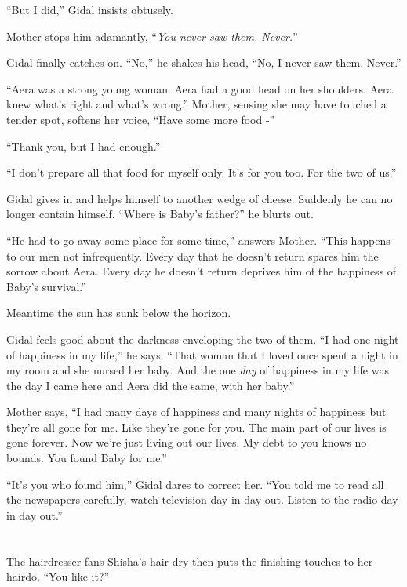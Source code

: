 \documentclass[twoside,11pt]{book}
\begin{document}
``But I did,'' Gidal insists obtusely.

Mother stops him adamantly, ``\textit{You never saw them. Never.}''

Gidal finally catches on. ``No,'' he shakes his head, ``No, I never saw them. Never.''

``Aera was a strong young woman. Aera had a good head on her shoulders. Aera knew what's right and what's
wrong.'' Mother, sensing she may have touched a tender spot, softens her voice, ``Have some
more food -''

``Thank you, but I had enough.''

``I don't prepare all that food for myself only. It's for you too. For the two of us.''

Gidal gives in and helps himself to another wedge of cheese. Suddenly he can no longer contain himself.
``Where is Baby's father?'' he blurts out.

``He had to go away some place for some time,'' answers Mother. ``This happens to
our men not infrequently. Every day that he doesn't return spares him the sorrow about Aera. Every day he doesn't
return deprives him of the happiness of Baby's survival.''

Meantime the sun has sunk below the horizon.

Gidal feels good about the darkness enveloping the two of them. ``I had one night of happiness in my
life,'' he says. ``That woman that I loved once spent a night in my room and she nursed her
baby. And the{ }one \textit{day }of happiness in my life was the day I came
here and Aera did the same, with her baby.''

Mother says, ``I had many days of happiness and many nights of happiness but they're all gone for me. Like
they're gone for you. The main part of our lives is gone forever. Now we're just living out our lives. My debt to you
knows no bounds. You found Baby for me.''

``It's you who found him,'' Gidal dares to correct her. ``You told me to read all
the newspapers carefully, watch television day in day out. Listen to the radio{ }day in day
out.''



\chapter{}

The hairdresser fans Shisha's hair dry then puts the finishing touches to her hairdo. ``You like it?''
\end{document}
